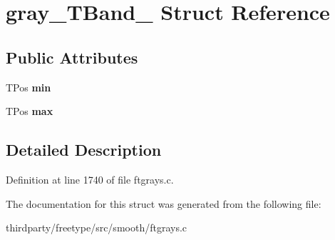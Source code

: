 \hypertarget{structgray___t_band__}{}\section{gray\+\_\+\+T\+Band\+\_\+ Struct Reference}
\label{structgray___t_band__}
\subsection*{Public Attributes}
\begin{DoxyCompactItemize}
\item 
\mbox{\label{structgray___t_band___ab297c74e94588313bfa4618c35af136b}} 
T\+Pos {\bfseries min}
\item 
\mbox{\label{structgray___t_band___a81a381e2349b9f18e79599310ec71214}} 
T\+Pos {\bfseries max}
\end{DoxyCompactItemize}


\subsection{Detailed Description}


Definition at line 1740 of file ftgrays.\+c.



The documentation for this struct was generated from the following file\+:\begin{DoxyCompactItemize}
\item 
thirdparty/freetype/src/smooth/ftgrays.\+c\end{DoxyCompactItemize}
